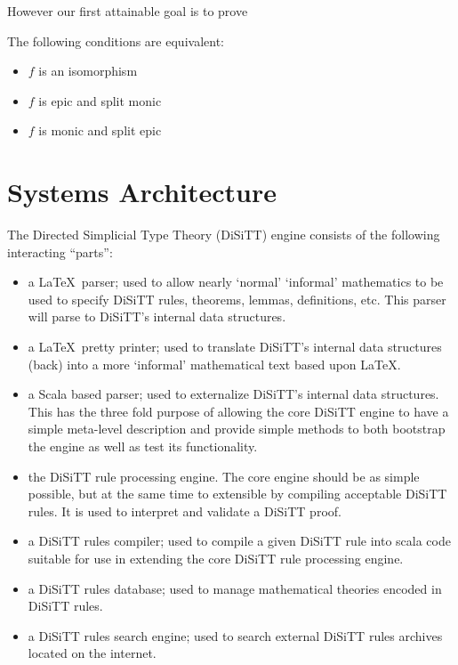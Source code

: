\documentclass[a4paper,openany]{amsbook}
\begin{document}
However our first attainable goal is to prove

\begin{theorem}
The following conditions are equivalent:
\begin{itemize}
  \item $f$ is an isomorphism
  \item $f$ is epic and split monic
  \item $f$ is monic and split epic
\end{itemize}
\end{theorem}

\chapter{Systems Architecture}

The Directed Simplicial Type Theory (DiSiTT) engine consists of the following
interacting ``parts'':
\begin{itemize}
  \item a \LaTeX\ parser; used to allow nearly `normal' `informal' mathematics
  to be used to specify DiSiTT rules, theorems, lemmas, definitions, etc. This
  parser will parse to DiSiTT's internal data structures.
  \item a \LaTeX\ pretty printer; used to translate DiSiTT's internal data
  structures (back) into a more `informal' mathematical text based upon
  \LaTeX.
  \item a Scala based parser; used to externalize DiSiTT's internal data
  structures. This has the three fold purpose of allowing the core DiSiTT
  engine to have a simple meta-level description and provide simple methods to
  both bootstrap the engine as well as test its functionality.
  \item the DiSiTT rule processing engine. The core engine should be as simple
  possible, but at the same time to extensible by compiling acceptable DiSiTT
  rules. It is used to interpret and validate a DiSiTT proof.
  \item a DiSiTT rules compiler; used to compile a given DiSiTT rule into
  scala code suitable for use in extending the core DiSiTT rule processing
  engine.
  \item a DiSiTT rules database; used to manage mathematical theories encoded
  in DiSiTT rules.
  \item a DiSiTT rules search engine; used to search external DiSiTT rules
  archives located on the internet.
\end{itemize}
%
\end{document}
